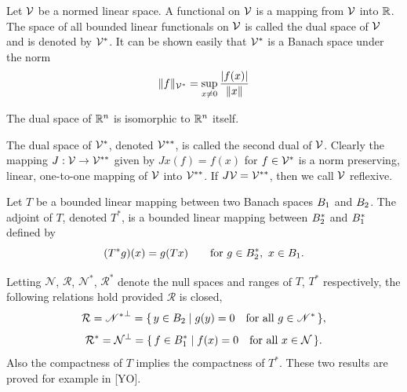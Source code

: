 \begin{definition}\label{gt.def5.4.dual-space}
Let $\V$ be a normed linear space. A functional on $\V$ is a mapping from $\V$ into $\R$. The space of all bounded linear functionals on $\V$ is called the dual space of $\V$ and is denoted by $\V^*$. It can be shown easily that $\V^*$ is a Banach space under the norm
\begin{equation}\label{gt.eq5.5}\dcref{(5.5)}\group{chapter-5}\source{gilbarg-trudinger:page-0091}
\|f\|_{\V^*}=\sup_{x\neq 0}\frac{|f(x)|}{\|x\|}
\end{equation}
\end{definition}

\begin{example}
The dual space of $\R^n$ is isomorphic to $\R^n$ itself.
\end{example}

\begin{definition}\label{gt.def5.4.reflexive}
The dual space of $\V^*$, denoted $\V^{**}$, is called the second dual of $\V$. Clearly the mapping $J:\V\to\V^{**}$ given by $Jx(f)=f(x)$ for $f\in\V^*$ is a norm preserving, linear, one-to-one mapping of $\V$ into $\V^{**}$. If $J\V=\V^{**}$, then we call $\V$ reflexive.
\end{definition}

\begin{definition}\label{gt.def5.4.adjoint}
Let $T$ be a bounded linear mapping between two Banach spaces $\B_1$ and $\B_2$. The adjoint of $T$, denoted $T^*$, is a bounded linear mapping between $\B_2^*$ and $\B_1^*$ defined by
\begin{equation}\label{gt.eq5.6}\dcref{(5.6)}\group{chapter-5}\source{gilbarg-trudinger:page-0091}
(T^*g)(x)=g(Tx) \qquad \text{for } g\in\B_2^*,\ x\in\B_1.
\end{equation}
\end{definition}

\begin{remark}
Letting $\mathcal N$, $\mathcal R$, $\mathcal N^*$, $\mathcal R^*$ denote the null spaces and ranges of $T$, $T^*$ respectively, the following relations hold provided $\mathcal R$ is closed,
\[
\mathcal R={\Nstar}^{\perp}=\{\,y\in \B_2\mid g(y)=0 \quad \text{for all } g\in \Nstar\,\},
\]
\[
\mathcal R^*=\mathcal N^\perp=\{\,f\in \B_1^*\mid f(x)=0 \quad \text{for all } x\in \mathcal N\,\}.
\]
Also the compactness of $T$ implies the compactness of $T^*$. These two results are proved for example in [YO].
\end{remark}

